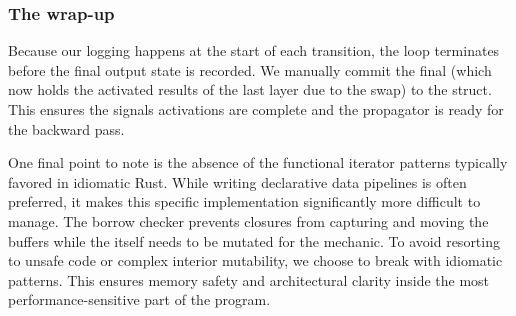 \subsubsection{The wrap-up}
Because our logging happens at the start of each transition, the loop terminates before the final output state is recorded. We manually commit the final  (which now holds the activated results of the last layer due to the swap) to the  struct. This ensures the signals activations are complete and the propagator is ready for the backward pass.\par
One final point to note is the absence of the functional iterator patterns typically favored in idiomatic Rust. While writing declarative data pipelines is often preferred, it makes this specific implementation significantly more difficult to manage. The borrow checker prevents closures from capturing and moving the buffers while the  itself needs to be mutated for the  mechanic. To avoid resorting to unsafe code or complex interior mutability, we choose to break with idiomatic patterns. This ensures memory safety and architectural clarity inside the most performance-sensitive part of the program.
